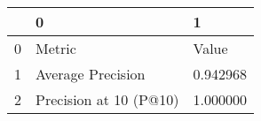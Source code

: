 \begin{tabular}{lll}
\toprule
 & 0 & 1 \\
\midrule
0 & Metric & Value \\
1 & Average Precision & 0.942968 \\
2 & Precision at 10 (P@10) & 1.000000 \\
\bottomrule
\end{tabular}
